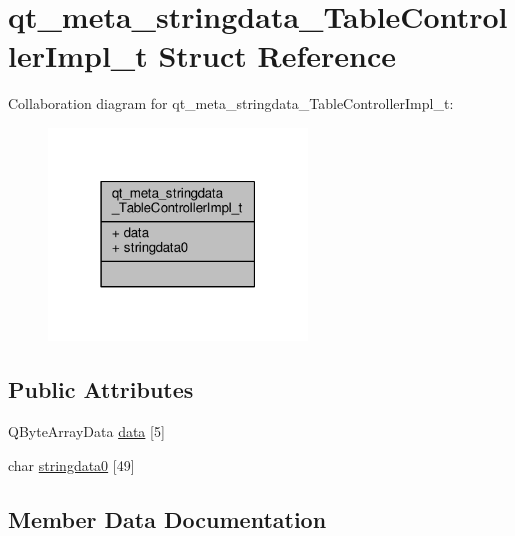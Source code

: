 \hypertarget{structqt__meta__stringdata___table_controller_impl__t}{}\section{qt\+\_\+meta\+\_\+stringdata\+\_\+\+Table\+Controller\+Impl\+\_\+t Struct Reference}
\label{structqt__meta__stringdata___table_controller_impl__t}


Collaboration diagram for qt\+\_\+meta\+\_\+stringdata\+\_\+\+Table\+Controller\+Impl\+\_\+t\+:\nopagebreak
\begin{figure}[H]
\begin{center}
\leavevmode
\includegraphics[width=195pt]{structqt__meta__stringdata___table_controller_impl__t__coll__graph}
\end{center}
\end{figure}
\subsection*{Public Attributes}
\begin{DoxyCompactItemize}
\item 
Q\+Byte\+Array\+Data \hyperlink{structqt__meta__stringdata___table_controller_impl__t_abf949a0469f361c0c90653150fc8d0b3}{data} \mbox{[}5\mbox{]}
\item 
char \hyperlink{structqt__meta__stringdata___table_controller_impl__t_ad671611e780842223ffc0eb77564b446}{stringdata0} \mbox{[}49\mbox{]}
\end{DoxyCompactItemize}


\subsection{Member Data Documentation}
